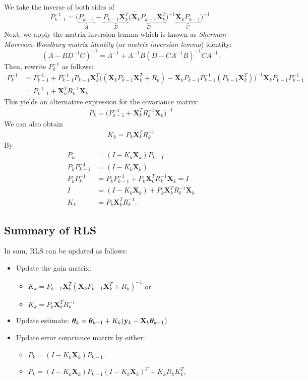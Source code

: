 We take the inverse of both sides of 
$$P_{k-1}^{-1} = \bigg(\underbrace{P_{k-1}}_{A}-\underbrace{P_{k-1}\mathbf{X}_k^T}_{B}\big(\underbrace{\mathbf{X}_kP_{k-1}\mathbf{X}_k^T}_{D}\big)^{-1}\underbrace{\mathbf{X}_kP_{k-1}}_{C}\bigg)^{-1}.$$
Next, we apply the matrix inversion lemma which is known as \textit{Sherman-Morrison-Woodbury matrix identity} (or \textit{matrix inversion lemma}) identity: 
$$(A-BD^{-1}C)^{-1} = A^{-1}+A^{-1}B(D-CA^{-1}B)^{-1}CA^{-1}.$$
Then, rewrite $P_k^{-1}$ as follows:
\begin{align*}
	P_k^{-1} &= P_{k-1}^{-1}+P_{k-1}^{-1}P_{k-1}\mathbf{X}_k^T\big((\mathbf{X}_kP_{k-1}\mathbf{X}_k^T+R_k)-\mathbf{X}_kP_{k-1}P_{k-1}^{-1}(P_{k-1}\mathbf{X}_k^T)\big)^{-1}\mathbf{X}_kP_{k-1}P_{k-1}^{-1}\\ 
			 &= P_{k-1}^{-1}+\mathbf{X}_k^TR_{k}^{-1}\mathbf{X}_k
\end{align*}
This yields an alternative expression for the covariance matrix:
\begin{align*}
	P_k = \big(P_{k-1}^{-1}+\mathbf{X}_k^TR_{k}^{-1}\mathbf{X}_k\big)^{-1}
\end{align*}
We can also obtain
\begin{align*}
	K_k = P_{k}\mathbf{X}_k^TR_{k}^{-1}
\end{align*}
By
\begin{align*}
	P_k &= (I-K_k\mathbf{X}_k)P_{k-1}\\
	P_kP_{k-1}^{-1} &= (I-K_k\mathbf{X}_k)\\
	P_kP_k^{-1} &= P_kP_{k-1}^{-1}+P_k\mathbf{X}_k^TR_{k}^{-1}\mathbf{X}_k=I\\
	I &= (I-K_k\mathbf{X}_k)+P_k\mathbf{X}_k^TR_{k}^{-1}\mathbf{X}_k\\
	K_k &= P_{k}\mathbf{X}_k^TR_{k}^{-1}.
\end{align*}

\subsection{Summary of RLS}
In sum, RLS can be updated as follows: 
\begin{itemize}
	\item Update the gain matrix: 
		\begin{itemize}
			\item $K_k = P_{k-1}\mathbf{X}_k^T(\mathbf{X}_kP_{k-1}\mathbf{X}_k^T+R_k)^{-1}$ or
			\item $K_k = P_{k}\mathbf{X}_k^TR_{k}^{-1}$
		\end{itemize}
	\item Update estimate: $\boldsymbol{\theta}_k = \boldsymbol{\theta}_{k-1}+K_k ({\mathbf{y}}_k-\mathbf{X}_k\boldsymbol{\theta}_{k-1})$
	\item Update error covariance matrix by either: 
		\begin{itemize}
			\item $P_k = (I-K_k\mathbf{X}_k)P_{k-1}$.
			\item $P_k = (I-K_k \mathbf{X}_k)P_{k-1}(I-K_k \mathbf{X}_k)^T+K_kR_kK_k^T,$
		\end{itemize}
\end{itemize}


